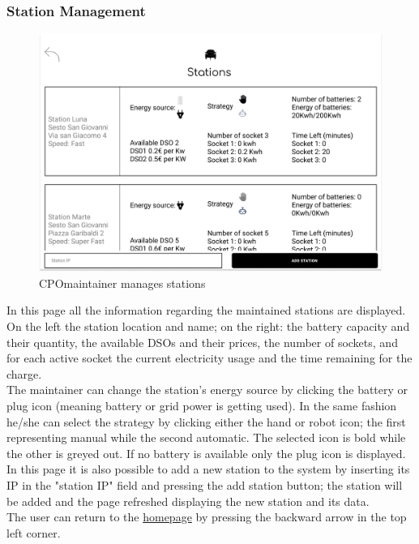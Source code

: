 \subsubsection{Station Management}
\begin{figure}[H]
    \centering
    \includegraphics[keepaspectratio, width=15cm]{Mockup/CPMSSiteInterface/Add Station.png}
    \caption{\ac{CPO}maintainer manages stations}
    \label{cpo:Station}
\end{figure}
In this page all the information regarding the maintained stations are displayed. On the left the station location and name; on the right:
the battery capacity and their quantity, the available \acp{DSO} and their prices, the number of sockets, and for each active socket the current electricity usage and the time remaining for the charge.\\
The maintainer can change the station's energy source by clicking the battery or plug icon (meaning battery or grid power is getting used). In the same fashion he/she can select the strategy by clicking either the hand or robot icon; the first representing manual while the second automatic.
The selected icon is bold while the other is greyed out. If no battery is available only the plug icon is displayed.\\
In this page it is also possible to add a new station to the system by inserting its IP in the "station IP" field and pressing the add station button; the station will be added and the page refreshed displaying the new station and its data.\\
The user can return to the \hyperref[cpo:Homepage]{homepage} by pressing the backward arrow in the top left corner.

